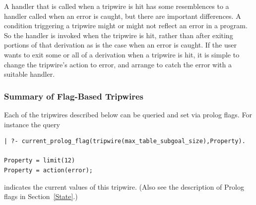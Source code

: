 A handler that is called when a tripwire is hit has some resemblences
 to a handler called when an error is caught, but there are important
 differences.  A condition triggering a tripwire might or might not
 reflect an error in a program.  So the handler is invoked when the
 tripwire is hit, rather than after exiting portions of that
 derivation as is the case when an error is caught.  If the user wants
 to exit some or all of a derivation when a tripwire is hit, it is
 simple to change the tripwire's action to error, and arrange to catch
 the error with a suitable handler.

\subsubsection{Summary of Flag-Based Tripwires}
%
Each of the tripwires described below can be queried and set via
 prolog flags.  For instance the query

\begin{verbatim}
| ?- current_prolog_flag(tripwire(max_table_subgoal_size),Property).

Property = limit(12)
Property = action(error);
\end{verbatim}
indicates the current values of this tripwire.  (Also see the
 description of Prolog flags in Section~\ref{State}.)

